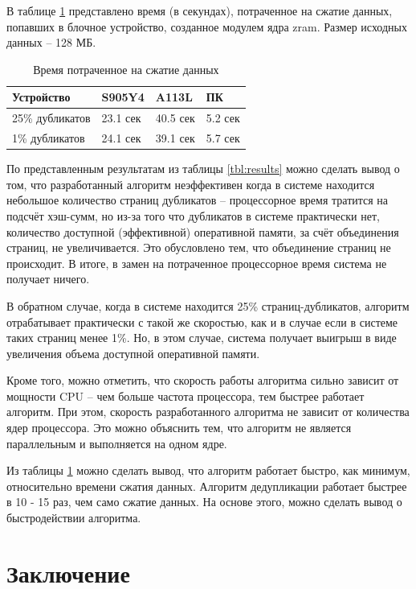 \documentclass[12pt, a4paper]{article}
\begin{document}
В таблице \ref{tbl:time} представлено время (в секундах), потраченное на сжатие данных, попавших в блочное устройство, созданное модулем ядра zram. Размер исходных данных -- 128 МБ. 

\begin{table}[ht]
	\small
	\caption{Время потраченное на сжатие данных}
	\label{tbl:time}
	\begin{tabular}{|l|l|l|l|}
		\hline
		Устройство & S905Y4 & A113L & ПК \\ \hline
		25\% дубликатов & 23.1 сек & 40.5 сек & 5.2 сек \\ \hline
		1\% дубликатов & 24.1 сек & 39.1 сек & 5.7 сек \\ \hline
	\end{tabular}
\end{table}

По представленным результатам из таблицы \ref{tbl:results} можно сделать вывод о том, что разработанный алгоритм неэффективен когда в системе находится небольшое количество страниц дубликатов -- процессорное время тратится на подсчёт хэш-сумм, но из-за того что дубликатов в системе практически нет, количество доступной (эффективной) оперативной памяти, за счёт объединения страниц, не увеличивается. Это обусловлено тем, что объединение страниц не происходит. В итоге, в замен на потраченное процессорное время система не получает ничего.

В обратном случае, когда в системе находится 25\% страниц-дубликатов, алгоритм отрабатывает практически с такой же скоростью, как и в случае если в системе таких страниц менее 1\%. Но, в этом случае, система получает выигрыш в виде увеличения объема доступной оперативной памяти.

Кроме того, можно отметить, что скорость работы алгоритма сильно зависит от мощности CPU -- чем больше частота процессора, тем быстрее работает алгоритм. При этом, скорость разработанного алгоритма не зависит от количества ядер процессора. Это можно объяснить тем, что алгоритм не является параллельным и выполняется на одном ядре.

Из таблицы \ref{tbl:time} можно сделать вывод, что алгоритм работает быстро, как минимум, относительно времени сжатия данных. Алгоритм дедупликации работает быстрее в 10 - 15 раз, чем само сжатие данных. На основе этого, можно сделать вывод о быстродействии алгоритма.

\section*{Заключение}
\end{document}
